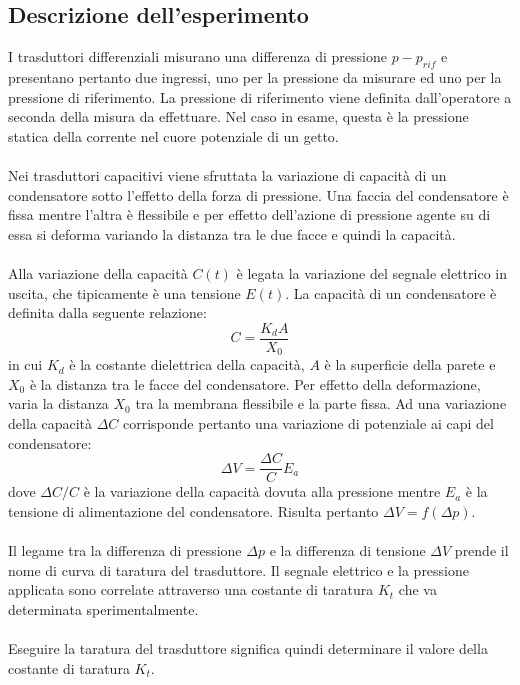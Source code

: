 \subsection{Descrizione dell'esperimento}
I trasduttori differenziali misurano una differenza di pressione $p-p_{rif}$ e presentano pertanto due ingressi, uno per la pressione da misurare ed uno per la pressione di riferimento. La pressione di riferimento viene definita dall'operatore a seconda della misura da effettuare. Nel caso in esame, questa è la pressione statica della corrente nel cuore potenziale di un getto.\\\\
Nei trasduttori capacitivi viene sfruttata la variazione di capacità di un condensatore sotto l'effetto della forza di pressione. Una faccia del condensatore è fissa mentre l'altra è flessibile e per effetto dell'azione di pressione agente su di essa si deforma variando la distanza tra le due facce e quindi la capacità.\\\\
Alla variazione della capacità $C(t)$ è legata la variazione del segnale elettrico in uscita, che tipicamente è una tensione $E(t)$. La capacità di un condensatore è definita dalla seguente relazione:
\begin{equation*}
    C = \frac{K_d A}{X_0}
\end{equation*}
in cui $K_d$ è la costante dielettrica della capacità, $A$ è la superficie della parete e $X_0$ è la distanza tra le facce del condensatore. Per effetto della deformazione, varia la distanza $X_0$ tra la membrana flessibile e la parte fissa. Ad una variazione della capacità $\Delta C$ corrisponde pertanto una variazione di potenziale ai capi del condensatore:
\begin{equation*}
    \Delta V = \frac{\Delta C}{C}E_a
\end{equation*}
dove $\Delta C/C$ è la variazione della capacità dovuta alla pressione mentre $E_a$ è la tensione di alimentazione del condensatore. Risulta pertanto $\Delta V = f(\Delta p)$.\\\\
Il legame tra la differenza di pressione $\Delta p$ e la differenza di tensione $\Delta V$ prende il nome di curva di taratura del trasduttore. Il segnale elettrico e la pressione applicata sono correlate attraverso una costante di taratura $K_t$ che va determinata sperimentalmente.\\\\
Eseguire la taratura del trasduttore significa quindi determinare il valore della costante di taratura $K_t$.

